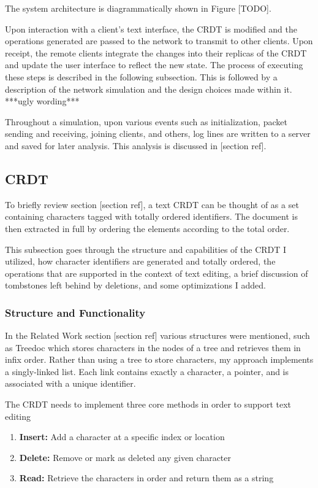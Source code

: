\documentclass[12pt,a4paper,twoside,openright]{report}
\begin{document}
	The system architecture is diagrammatically shown in Figure [TODO].
	
	Upon interaction with a client's text interface, the CRDT is modified and the operations generated are passed to the network to transmit to other clients. Upon receipt, the remote clients integrate the changes into their replicas of the CRDT and update the user interface to reflect the new state. The process of executing these steps is described in the following subsection. This is followed by a description of the network simulation and the design choices made within it.  ***ugly wording***
	
	Throughout a simulation, upon various events such as initialization, packet sending and receiving, joining clients, and others, log lines are written to a server and saved for later analysis. This analysis is discussed in [section ref].
	
	
	\subsection{CRDT}
		To briefly review section [section ref], a text CRDT can be thought of as a set containing characters tagged with totally ordered identifiers. The document is then extracted in full by ordering the elements according to the total order. 
		
		This subsection goes through the structure and capabilities of the CRDT I utilized, how character identifiers are generated and totally ordered, the operations that are supported in the context of text editing, a brief discussion of tombstones left behind by deletions, and some optimizations I added.
		
		\subsubsection{Structure and Functionality}
		In the Related Work section [section ref] various structures were mentioned, such as Treedoc which stores characters in the nodes of a tree and retrieves them in infix order. Rather than using a tree to store characters, my approach implements a singly-linked list. Each link contains exactly a character, a pointer, and is associated with a unique identifier.
		
		The CRDT needs to implement three core methods in order to support text editing
		\begin{enumerate}
			\item \textbf{Insert:} Add a character at a specific index or location
			\item \textbf{Delete:} Remove or mark as deleted any given character
			\item \textbf{Read:} Retrieve the characters in order and return them as a string
		\end{enumerate} 
		
\end{document}
